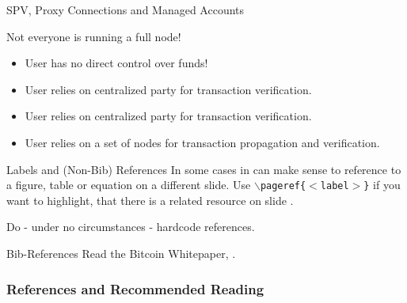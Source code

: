 \documentclass[handout]{beamer}
\begin{document}
\begin{frame}{SPV, Proxy Connections and Managed Accounts}

Not everyone is running a full node! \\ \vspace{1em}

	
	\begin{itemize}
		\item<2-> User has no direct control over funds!
		\item<3-> User relies on centralized party for transaction verification.
	\end{itemize}

	\vspace{1em}	
		
		
		\begin{itemize}
		\item<5-> User relies on centralized party for transaction verification.
	\end{itemize}		
	
	\vspace{1em}
	
	
	\begin{itemize}
		\item<7-> User relies on a set of nodes for transaction propagation and verification.

	\end{itemize}
	

	
\end{frame}



\begin{frame}{Labels and (Non-Bib) References}
	In some cases in can make sense to reference to a figure, table or equation on a different slide. Use \texttt{$\backslash$pageref\{$<$label$>$\}} if you want to highlight, that there is a related resource on slide \pageref{fig:logo}.\\ \vspace{1em}
	
	Do - under no circumstances - hardcode references.	
\end{frame}


\begin{frame}{Bib-References}
		Read the Bitcoin Whitepaper, \cite{nakamotoBitcoin2008}.
\end{frame}


\begin{frame}%
\frametitle{References and Recommended Reading}
	
	
\end{frame}
\end{document}
